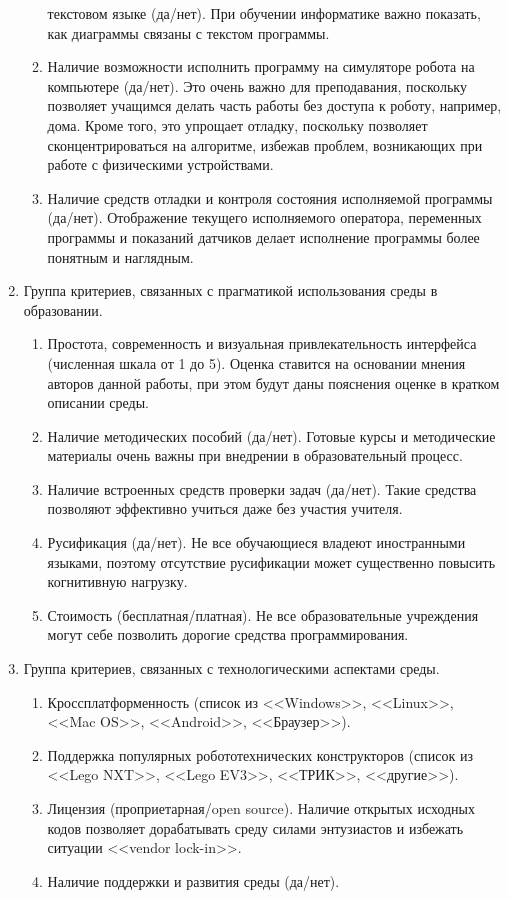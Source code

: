 \documentclass[a5paper]{article}
\begin{document}
\begin{enumerate}
\begin{enumerate}
                текстовом языке (да/нет). При обучении информатике важно показать, как диаграммы 
                связаны с текстом программы.
        \item Наличие возможности исполнить программу на симуляторе робота на компьютере (да/нет). Это 
                очень важно для преподавания, поскольку позволяет учащимся делать часть работы без доступа к 
                роботу, например, дома. Кроме того, это упрощает отладку, поскольку позволяет сконцентрироваться 
                на алгоритме, избежав проблем, возникающих при работе с физическими устройствами.
        \item Наличие средств отладки и контроля состояния исполняемой программы (да/нет). Отображение 
                текущего исполняемого оператора, переменных программы и показаний датчиков делает исполнение 
                программы более понятным и наглядным.    
    \end{enumerate}
    \item Группа критериев, связанных с прагматикой использования среды в образовании.
    \begin{enumerate}
        \item Простота, современность и визуальная привлекательность интерфейса (численная шкала от 1 до 5). 
                Оценка ставится на основании мнения авторов данной работы, при этом будут даны пояснения 
                оценке в кратком описании среды.
        \item Наличие методических пособий (да/нет). Готовые курсы и методические материалы очень 
                важны при внедрении в образовательный процесс.
        \item Наличие встроенных средств проверки задач (да/нет). Такие средства позволяют эффективно 
                учиться даже без участия учителя.
        \item Русификация (да/нет). Не все обучающиеся владеют иностранными языками, поэтому отсутствие 
                русификации может существенно повысить когнитивную нагрузку.
        \item Стоимость (бесплатная/платная). Не все образовательные учреждения могут себе позволить дорогие 
                средства программирования.
    \end{enumerate}
    \item Группа критериев, связанных с технологическими аспектами среды.
    \begin{enumerate}
        \item Кроссплатформенность (список из <<Windows>>, <<Linux>>, <<Mac OS>>, <<Android>>, <<Браузер>>).
        \item Поддержка популярных робототехнических конструкторов (список из <<Lego NXT>>, <<Lego EV3>>, 
                <<ТРИК>>, <<другие>>).
        \item Лицензия (проприетарная/open source). Наличие открытых исходных кодов позволяет дорабатывать 
                среду силами энтузиастов и избежать ситуации <<vendor lock-in>>.
        \item Наличие поддержки и развития среды (да/нет).
    \end{enumerate}
\end{enumerate}
\end{document}

